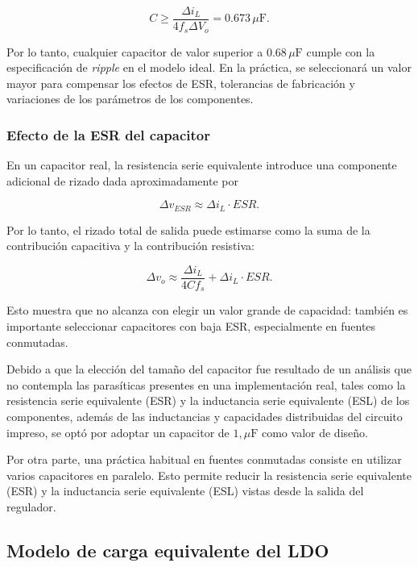 \documentclass[a4paper,12pt]{article}
\begin{document}
\[
C \ge
\frac{\Delta i_L}{4f_s\Delta V_o}
=
0.673\,\mu\text{F}.
\]

Por lo tanto, cualquier capacitor de valor superior a $0.68\,\mu\text{F}$ cumple con la especificación de \textit{ripple} en el modelo ideal. En la práctica, se seleccionará un valor mayor para compensar los efectos de ESR, tolerancias de fabricación y variaciones de los parámetros de los componentes.

\subsubsection{Efecto de la ESR del capacitor}

En un capacitor real, la resistencia serie equivalente introduce una componente adicional de rizado dada aproximadamente por

\begin{equation}
    \Delta v_{ESR} \approx \Delta i_L \cdot ESR.
\end{equation}

Por lo tanto, el rizado total de salida puede estimarse como la suma de la contribución capacitiva y la contribución resistiva:

\begin{equation}
    \Delta v_o \approx \frac{\Delta i_L}{4 C f_s} + \Delta i_L \cdot ESR.
\end{equation}

Esto muestra que no alcanza con elegir un valor grande de capacidad: también es importante seleccionar capacitores con baja ESR, especialmente en fuentes conmutadas.

Debido a que la elección del tamaño del capacitor fue resultado de un análisis que no contempla las parasíticas presentes en una implementación real, tales como la resistencia serie equivalente (ESR) y la inductancia serie equivalente (ESL) de los componentes, además de las inductancias y capacidades distribuidas del circuito impreso, se optó por adoptar un capacitor de $1,\mu\text{F}$ como valor de diseño.

Por otra parte, una práctica habitual en fuentes conmutadas consiste en utilizar varios capacitores en paralelo. Esto permite reducir la resistencia serie equivalente (ESR) y la inductancia serie equivalente (ESL) vistas desde la salida del regulador.


\subsection{Modelo de carga equivalente del LDO}
\end{document}
